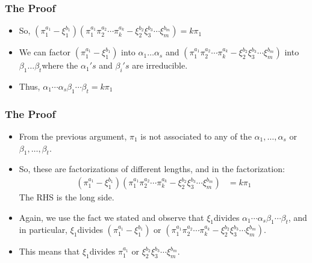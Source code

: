 \begin{frame}
  \frametitle{The Proof}
  \begin{itemize}
    \item So, $(\pi_{1}^{a_{1}}-\xi_{1}^{b_{1}})(\pi_{1}^{a_{1}}\pi_{2}^{a_{2}}\cdots\pi_{k}^{a_{k}}-\xi_{2}^{b_{2}}\xi_{3}^{b_{3}}\cdots\xi_{m}^{b_{m}})=k\pi_{1}$
  \end{itemize}

  \pause{}
  \begin{itemize}
    \item We can factor $(\pi_{1}^{a_{1}}-\xi_{1}^{b_{1}})$ into $\alpha_{1}\ldots\alpha_{s}$ and $(\pi_{1}^{a_{1}}\pi_{2}^{a_{2}}\cdots\pi_{k}^{a_{k}}-\xi_{2}^{b_{2}}\xi_{3}^{b_{3}}\cdots\xi_{m}^{b_{m}})$ into $\beta_{1}\ldots\beta_{t}$where the $\alpha_{1}'s$ and $\beta_{i}'s$ are irreducible. 
  \end{itemize}

  \pause{}
  \begin{itemize}
    \item Thus, $\alpha_{1}\cdots\alpha_{s}$$\beta_{1}\cdots\beta_{t}=k\pi_{1}$ 
  \end{itemize}
\end{frame}

\begin{frame}
  \frametitle{The Proof}
  \begin{itemize}
    \item From the previous argument, $\pi_{1}$ is not associated to any of the $\alpha_{1},\ldots,\alpha_{s}$ or $\beta_{1},\ldots,\beta_{t}$. 
  \end{itemize}

  \pause{}
  \begin{itemize}
    \item So, these are factorizations of different lengths, and in the factorization:
      \begin{align*}
	(\pi_{1}^{a_{1}}-\xi_{1}^{b_{1}})(\pi_{1}^{a_{1}}\pi_{2}^{a_{2}}\cdots\pi_{k}^{a_{k}}-\xi_{2}^{b_{2}}\xi_{3}^{b_{3}}\cdots\xi_{m}^{b_{m}}) & =k\pi_{1}
      \end{align*}
      The RHS is the long side. 
  \end{itemize}

  \pause{}
  \begin{itemize}
    \item Again, we use the fact we stated and observe that $\xi_{1}$divides $\alpha_{1}\cdots\alpha_{s}$$\beta_{1}\cdots\beta_{t}$, and in particular, $\xi_{1}$divides $(\pi_{1}^{a_{1}}-\xi_{1}^{b_{1}})$ or $(\pi_{1}^{a_{1}}\pi_{2}^{a_{2}}\cdots\pi_{k}^{a_{k}}-\xi_{2}^{b_{2}}\xi_{3}^{b_{3}}\cdots\xi_{m}^{b_{m}}).$
    \item This means that $\xi_{1}$divides $\pi_{1}^{a_{1}}$ or $\xi_{2}^{b_{2}}\xi_{3}^{b_{3}}\cdots\xi_{m}^{b_{m}}$.
  \end{itemize}
\end{frame}

